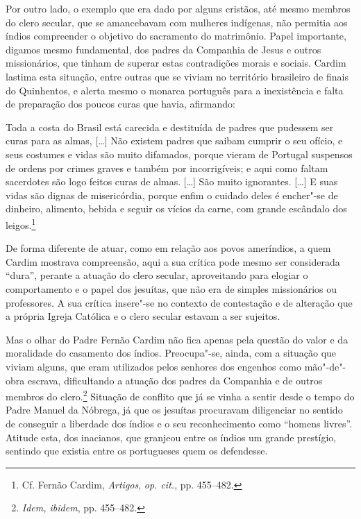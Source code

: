 Por outro lado, o exemplo que era dado por alguns cristãos, até
mesmo membros do clero secular, que se amancebavam com mulheres
indígenas, não permitia aos índios compreender o objetivo do
sacramento do matrimônio. Papel importante, digamos mesmo fundamental,
dos padres da Companhia de Jesus e outros missionários, que tinham de
superar estas contradições morais e sociais. Cardim lastima esta
situação, entre outras que se viviam no território brasileiro de
finais do Quinhentos, e alerta mesmo o monarca português para a
inexistência e falta de preparação dos poucos curas que havia,
afirmando:

\begin{hedraquote}
Toda a costa do Brasil está carecida e destituída de padres
que pudessem ser curas para as almas, [\ldots{}] Não existem padres que
saibam cumprir o seu ofício, e seus costumes e vidas são muito
difamados, porque vieram de Portugal suspensos de ordens por crimes
graves e também por incorrigíveis; e aqui como faltam sacerdotes são
logo feitos curas de almas. [\ldots{}] São muito ignorantes. [\ldots{}] E suas
vidas são dignas de misericórdia, porque enfim o cuidado deles é
encher"-se de dinheiro, alimento, bebida e seguir os vícios da carne,
com grande escândalo dos leigos.\footnote{ Cf. Fernão Cardim,
\textit{Artigos}, \textit{op. cit.}, pp. 455--482.}
\end{hedraquote}

 De forma diferente de atuar, como em relação aos povos
ameríndios, a quem Cardim mostrava compreensão, aqui a sua crítica
pode mesmo ser considerada ``dura'', perante a atuação do clero
secular, aproveitando para elogiar o comportamento e o papel dos
jesuítas, que não era de simples missionários ou professores. A sua
crítica insere"-se no contexto de contestação e de alteração que a
própria Igreja Católica e o clero secular estavam a ser sujeitos.

Mas o olhar do Padre Fernão Cardim não fica apenas pela questão do
valor e da moralidade do casamento dos índios. Preocupa"-se, ainda, com
a situação que viviam alguns, que eram utilizados pelos senhores dos
engenhos como mão"-de"-obra escrava, dificultando a atuação dos padres
da Companhia e de outros membros do clero.\footnote{ \textit{Idem, ibidem}, 
pp. 455--482.} Situação de conflito que já se vinha a
sentir desde o tempo do Padre Manuel da Nóbrega, já que os jesuítas
procuravam diligenciar no sentido de conseguir a liberdade dos índios e
o seu reconhecimento como ``homens livres''. Atitude esta, dos inacianos,
que granjeou entre os índios um grande prestígio, sentindo que existia
entre os portugueses quem os defendesse. 

